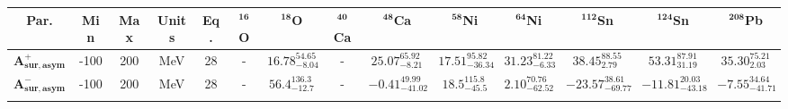 \bgroup
\def\arraystretch{1.5}%
\begin{tabular}{ c c c c c c c c c c c c c c} 
\textbf{Par.} & \textbf{Min} & \textbf{Max} &                \textbf{Units} & \textbf{Eq.}& \textbf{$\mathbf{^{16}}$O}& \textbf{$\mathbf{^{18}}$O}& \textbf{$\mathbf{^{40}}$Ca}& \textbf{$\mathbf{^{48}}$Ca}& \textbf{$\mathbf{^{58}}$Ni}& \textbf{$\mathbf{^{64}}$Ni}& \textbf{$\mathbf{^{112}}$Sn}& \textbf{$\mathbf{^{124}}$Sn}& \textbf{$\mathbf{^{208}}$Pb}\\
 \hline 
$\mathbf{A_{sur,asym}^{+}}$ & -100 & 200 & MeV & 28 & -  & $16.78^{54.65}_{-8.04}$ & - & $25.07^{65.92}_{-8.21}$ & $17.51^{95.82}_{-36.34}$ & $31.23^{81.22}_{-6.33}$ & $38.45^{88.55}_{2.79}$ & $53.31^{87.91}_{31.19}$ & $35.30^{75.21}_{2.03}$\\ 
$\mathbf{A_{sur,asym}^{-}}$ & -100 & 200 & MeV & 28 & -  & $56.4^{136.3}_{-12.7}$ & - & $-0.41^{49.99}_{-41.02}$ & $18.5^{115.8}_{-45.5}$ & $2.10^{70.76}_{-62.52}$ & $-23.57^{38.61}_{-69.77}$ & $-11.81^{20.03}_{-43.18}$ & $-7.55^{34.64}_{-41.71}$\\ 
\\ 
\end{tabular}
\egroup